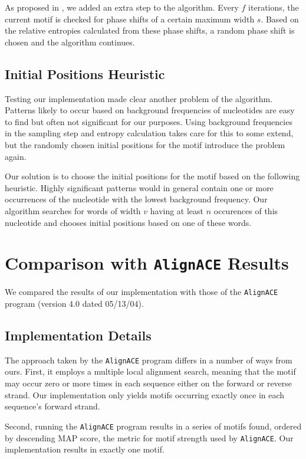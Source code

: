 \documentclass[a4paper,11pt]{article}
\begin{document}
As proposed in \cite{Lawrence93}, we added an extra step to the algorithm.
Every $f$ iterations, the current motif is checked for phase shifts of a
certain maximum width $s$. Based on the relative entropies calculated from
these phase shifts, a random phase shift is chosen and the algorithm
continues.


\subsection*{Initial Positions Heuristic}

Testing our implementation made clear another problem of the algorithm.
Patterns likely to occur based on background frequencies of nucleotides are
easy to find but often not significant for our purposes. Using background
frequencies in the sampling step and entropy calculation takes care for this
to some extend, but the randomly chosen initial positions for the motif
introduce the problem again.

Our solution is to choose the initial positions for the motif based on the
following heuristic. Highly significant patterns would in general contain one
or more occurrences of the nucleotide with the lowest background frequency.
Our algorithm searches for words of width $v$ having at least $n$ occurences
of this nucleotide and chooses initial positions based on one of these words.


\section{Comparison with \texttt{AlignACE} Results}

We compared the results of our implementation with those of the
\texttt{AlignACE} program \cite{AlignACE} (version 4.0 dated 05/13/04).


\subsection*{Implementation Details}

The approach taken by the \texttt{AlignACE} program differs in a number of
ways from ours. First, it employs a multiple local alignment search, meaning
that the motif may occur zero or more times in each sequence either on the
forward or reverse strand. Our implementation only yields motifs occurring
exactly once in each sequence's forward strand.

Second, running the \texttt{AlignACE} program results in a series of motifs
found, ordered by descending MAP score, the metric for motif strength used by
\texttt{AlignACE}. Our implementation results in exactly one motif.
\end{document}
